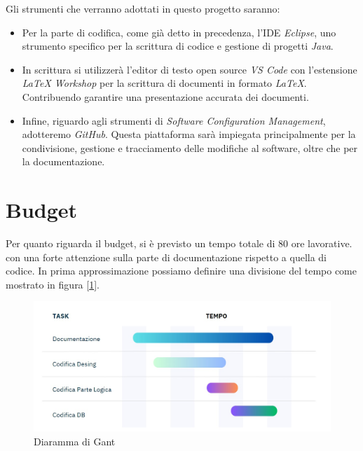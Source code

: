 \documentclass{book}
\begin{document}
Gli strumenti che verranno adottati in questo progetto saranno:
\begin{itemize}
    \item Per la parte di codifica, come già detto in precedenza, l'IDE \textit{Eclipse}, uno strumento specifico per la scrittura di codice e gestione di progetti \textit{Java}.
    \item In scrittura si utilizzerà l'editor di testo open source \textit{VS Code} con l'estensione \textit{LaTeX Workshop} per la scrittura di documenti in formato \textit{LaTeX}. Contribuendo garantire una presentazione accurata dei documenti.
    \item Infine, riguardo agli strumenti di \textit{Software Configuration Management}, adotteremo \textit{GitHub}. Questa piattaforma sarà impiegata principalmente per la condivisione, gestione e tracciamento delle modifiche al software, oltre che per la documentazione. 

\end{itemize}

\section{Budget}

Per quanto riguarda il budget, si è previsto un tempo totale di 80 ore lavorative. con una forte attenzione sulla parte di documentazione rispetto a quella di codice.
In prima approssimazione possiamo definire una divisione del tempo come mostrato in figura [\ref{fig: diagramma_gant}]. 
\begin{figure}[h]
    \centering
    \includegraphics[width = 1\linewidth]{Diagramma_Gant.jpg}
    \caption{Diaramma di Gant}
    \label{fig: diagramma_gant}    
\end{figure}
\end{document}
